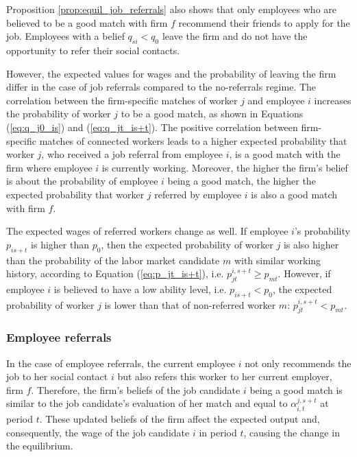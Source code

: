 \documentclass[12pt]{article}
\begin{document}
Proposition \ref{prop:equil_job_referrals} also shows that only employees who are believed to be a good match with firm $f$ recommend their friends to apply for the job. Employees with a belief $q_{si} < q_0$ leave the firm and do not have the opportunity to refer their social contacts.

However, the expected values for wages and the probability of leaving the firm differ in the case of job referrals compared to the no-referrals regime. The correlation between the firm-specific matches of worker $j$ and employee $i$ increases the probability of worker $j$ to be a good match, as shown in Equations (\ref{eq:q_j0_is}) and (\ref{eq:q_jt_is+t}). The positive correlation between firm-specific matches of connected workers leads to a higher expected probability that worker $j$, who received a job referral from employee $i$, is a good match with the firm where employee $i$ is currently working. Moreover, the higher the firm's belief is about the probability of employee $i$ being a good match, the higher the expected probability that worker $j$ referred by employee $i$ is also a good match with firm $f$.

The expected wages of referred workers change as well. If employee $i$'s probability $p_{is+t}$ is higher than $p_0$, then the expected probability of worker $j$ is also higher than the probability of the labor market candidate $m$ with similar working history, according to Equation (\ref{eq:p_jt_is+t}), i.e. $p_{jt}^{i,s+t} \geq p_{mt}$. However, if employee $i$ is believed to have a low ability level, i.e. $p_{is+t} < p_0$, the expected probability of worker $j$ is lower than that of non-referred worker $m$: $p_{jt}^{i,s+t} < p_{mt}$.













\subsubsection{Employee referrals}
In the case of employee referrals, the current employee $i$ not only recommends the job to her social contact $i$ but also refers this worker to her current employer, firm $f$. Therefore, the firm's beliefs of the job candidate $i$ being a good match is similar to the job candidate's evaluation of her match and equal to $\alpha_{i,t}^{j,s+t}$ at period $t$. These updated beliefs of the firm affect the expected output and, consequently, the wage of the job candidate $i$ in period $t$, causing the change in the equilibrium.
\end{document}
